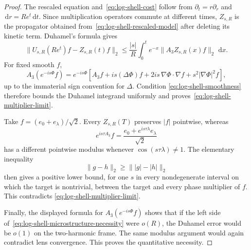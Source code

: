 \documentclass[11pt]{article}
\theoremstyle{remark}
\newcommand{\dd}{\,\mathrm d}
\begin{document}
\begin{proof}
The rescaled equation and~\eqref{eq:log-shell-cost} follow from
$\partial_t=r\partial_r$ and $\dd r=Re^t\dd t$.  Since multiplication
operators commute at different times, $Z_{s,R}$ is the propagator obtained
from~\eqref{eq:log-shell-rescaled-model} after deleting its kinetic term.
Duhamel's formula gives
\[
 \|U_{s,R}(Re^t)f-Z_{s,R}(t)f\|_2
 \leq
 \frac{|s|}{R}\int_0^t e^{-x}
 \|A_3Z_{s,R}(x)f\|_2\,\dd x.
\]
For fixed smooth $f$,
\[
 A_3(e^{-is\Phi}f)
 =
 e^{-is\Phi}
 \left[
 A_3f
 {}+is(\Delta\Phi)f
 {}+2is\,\nabla\Phi\cdot\nabla f
 {}+s^2|\nabla\Phi|^2f
 \right],
\]
up to the immaterial sign convention for $\Delta$.  Condition
\eqref{eq:log-shell-smoothness} therefore bounds the Duhamel integrand
uniformly and proves~\eqref{eq:log-shell-multiplier-limit}.

Take $f=(e_0+e_\lambda)/\sqrt2$.  Every $Z_{s,R}(T)$ preserves $|f|$
pointwise, whereas
\[
 e^{is\tau A_3}f
 =
 \frac{e_0+e^{is\tau\lambda}e_\lambda}{\sqrt2}
\]
has a different pointwise modulus whenever
$\cos(s\tau\lambda)\neq1$.  The elementary inequality
\[
 \|g-h\|_2\geq\bigl\||g|-|h|\bigr\|_2
\]
then gives a positive lower bound, for one $s$ in every nondegenerate
interval on which the target is nontrivial, between the target and every
phase multiplier of $f$.  This contradicts
\eqref{eq:log-shell-multiplier-limit}.

Finally, the displayed formula for $A_3(e^{-is\Phi}f)$ shows that if the
left side of~\eqref{eq:log-shell-microstructure-necessity} were $o(R)$, the
Duhamel error would be $o(1)$ on the two-harmonic frame.  The same modulus
argument would again contradict lens convergence.  This proves the
quantitative necessity.
\end{proof}
\end{document}
